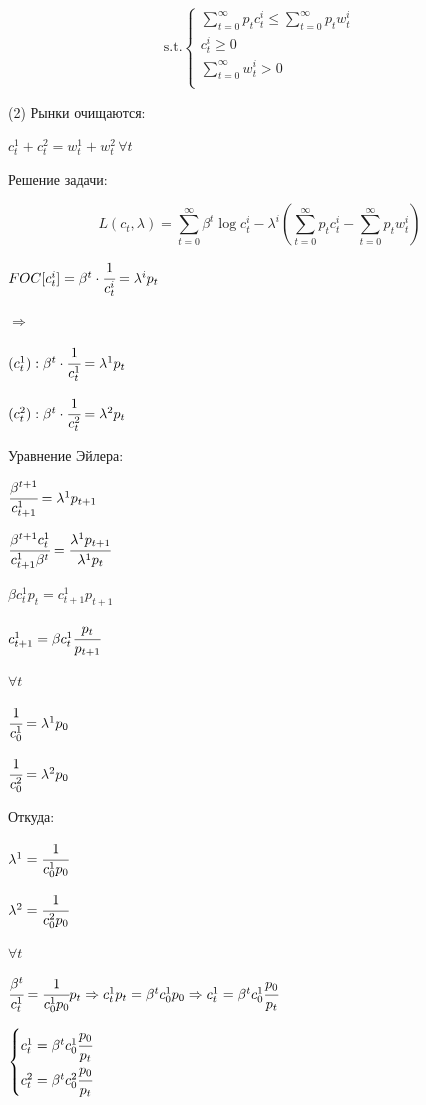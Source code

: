 \documentclass[reqno]{article}
\theoremstyle{definition}
\theoremstyle{definition}
\theoremstyle{definition}
\theoremstyle{definition}
\theoremstyle{definition}
\theoremstyle{definition}
\theoremstyle{definition}
\theoremstyle{definition}
\theoremstyle{definition}
\begin{document}
	$$
	\text{s.t.}
	\begin{cases}
		\sum_{t=0}^\infty p_t c_t^i \leq \sum_{t=0}^\infty p_t w_t^i \\
		
		c_t^i \geq 0 \\ 
		
		\sum_{t=0}^\infty w_t^i > 0 \\
	\end{cases}
	$$	
	
	(2) Рынки очищаются:
	
	$c_t^1 + c_t^2 = w_t^1 + w_t^2 \, \forall t$
	
	Решение задачи:
	
	$$L(c_t, \lambda) = \sum_{t=0}^\infty \beta^t \log c_t^i - \lambda^i \left( \sum\limits_{t=0}^\infty p_t c_t^i - \sum\limits_{t=0}^\infty p_t w_t^i \right)$$
	
	$FOC[c_t^i] = \beta^t \cdot \cfrac{1}{c_t^i} = \lambda^i p_t$
	
	$\Rightarrow$
	
	$(c_t^1): \beta^t \cdot \cfrac{1}{c_t^1} = \lambda^1 p_t$
	
	$(c_t^2): \beta^t \cdot \cfrac{1}{c_t^2} = \lambda^2 p_t$
	
	Уравнение Эйлера:
	
	$\cfrac{\beta^{t+1}}{c_{t+1}^1}=\lambda^1 p_{t+1}$
	
	$\cfrac{\beta^{t+1} c_{t}^1}{c_{t+1}^1 \beta^t}=\cfrac{\lambda^1 p_{t+1}}{\lambda^1 p_{t}}$
	
	$\beta c_{t}^1 p_t=c_{t+1}^1 p_{t+1}$
	
	$c_{t+1}^1 = \beta c_{t}^1 \cfrac{p_t}{p_{t+1}}$
	
	$\forall t$
	
	$\cfrac{1}{c_0^1}=\lambda^1 p_0$
	
	$\cfrac{1}{c_0^2}=\lambda^2 p_0$
	
	Откуда:
	
	$\lambda^1 = \cfrac{1}{c_0^1 p_0}$
	
	$\lambda^2 = \cfrac{1}{c_0^2 p_0}$
	
	$\forall t$
	
	$\cfrac{\beta^t}{c_t^1}=\cfrac{1}{c_0^1 p_0} p_t \Rightarrow c_t^1 p_t = \beta^t c_0^1 p_0 \Rightarrow c_t^1 = \beta^t c_0^1 \cfrac{p_0}{p_t}$
	
	$
	\begin{cases}
		c_t^1 =  \beta^t c_0^1 \cfrac{p_0}{p_t}\\
		
		c_t^2 =  \beta^t c_0^2 \cfrac{p_0}{p_t}\\
	\end{cases}
	$
	
\end{document}
